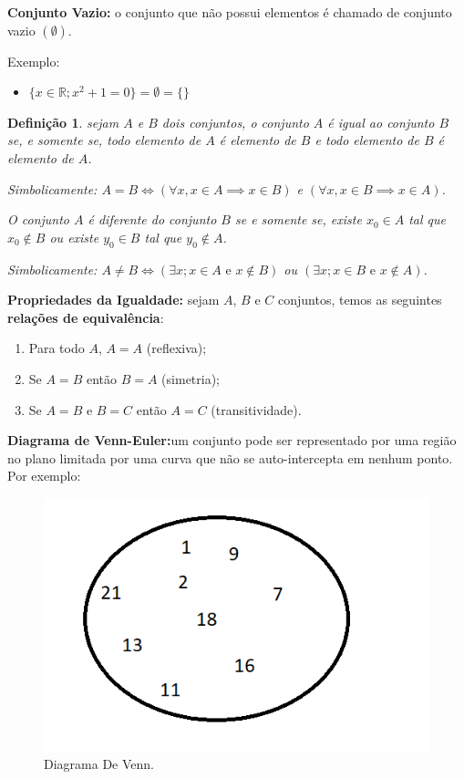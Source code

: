 \documentclass[oneside,a4paper,12pt]{article}
\newtheorem{definition}{Definição}[section]
\begin{document}
\textbf{Conjunto Vazio:} o conjunto que não possui elementos é chamado de conjunto vazio $(\emptyset)$.

Exemplo:
\begin{itemize}
	\item $\{ x\in \mathbb{R}; x^{2}+1=0 \} = \emptyset = \{\}$
\end{itemize}
	
	
\begin{definition}
	sejam $A$ e $B$ dois conjuntos, o conjunto $A$ é igual ao conjunto $B$ se, e somente se, todo elemento de $A$ é elemento de $B$ e todo elemento de $B$ é elemento de $A$. 

	Simbolicamente: $A = B \Leftrightarrow (\forall x, x \in A \implies x \in B)$ e $(\forall x, x \in B \implies x \in A)$.

	O conjunto $A$ é diferente do conjunto $B$ se e somente se, existe $x_0 \in A$ tal que $x_0 \notin B$ ou existe $y_0 \in B$ tal que $y_0 \notin A$.

	Simbolicamente: $A \neq B \Leftrightarrow (\exists x; x \in A \text{ e } x \notin B)$ ou $(\exists x; x \in B \text{ e } x \notin A)$.
\end{definition}

\textbf{Propriedades da Igualdade:} sejam $A$, $B$ e $C$ conjuntos, temos as seguintes \textbf{relações de equivalência}:
\begin{enumerate}
	\item Para todo $A$, $A=A$ (reflexiva);
	\item Se $A=B$ então $B=A$ (simetria);
	\item Se $A=B$ e $B=C$ então $A=C$ (transitividade).
\end{enumerate}

\textbf{Diagrama de Venn-Euler:}um conjunto pode ser representado por uma região no plano limitada por uma curva que não se auto-intercepta em nenhum ponto. Por exemplo:

\begin{figure}[h]
	\centering
	\includegraphics[width=0.45\linewidth]{Figuras/venn1}
	\caption{Diagrama De Venn.}
	\label{venn1}
\end{figure}
\end{document}
